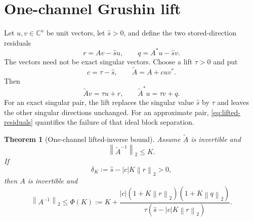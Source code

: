 \documentclass[11pt]{article}
\newtheorem{theorem}{Theorem}[section]
\theoremstyle{definition}
\theoremstyle{remark}
\newcommand{\C}{\mathbb C}
\newcommand{\norm}[1]{\left\lVert#1\right\rVert}
\newcommand{\Atilde}{\widetilde A}
\begin{document}
\section{One-channel Grushin lift}
\label{sec:grushin}

Let $u,v\in\C^n$ be unit vectors, let $\widehat s>0$, and define the two
stored-direction residuals
\begin{equation}
 r=Av-\widehat s u,
 \qquad
 q=A^*u-\widehat s v.
 \label{eq:singular-residuals}
\end{equation}
The vectors need not be exact singular vectors.  Choose a lift
$\tau>0$ and put
\begin{equation}
 c=\tau-\widehat s,
 \qquad
 \Atilde=A+cuv^*.
 \label{eq:lifted-operator}
\end{equation}
Then
\begin{equation}
 \Atilde v=\tau u+r,
 \qquad
 \Atilde^*u=\tau v+q.
 \label{eq:lifted-residuals}
\end{equation}
For an exact singular pair, the lift replaces the singular value
$\widehat s$ by $\tau$ and leaves the other singular directions unchanged.
For an approximate pair, \cref{eq:lifted-residuals} quantifies the failure of
that ideal block separation.

\begin{theorem}[One-channel lifted-inverse bound]
\label{thm:lifted-bound}
Assume $\Atilde$ is invertible and
\begin{equation}
 \norm{\Atilde^{-1}}_2\leq K.
 \label{eq:bulk-bound}
\end{equation}
If
\begin{equation}
 \delta_K:=\widehat s-|c|K\norm{r}_2>0,
 \label{eq:delta-k}
\end{equation}
then $A$ is invertible and
\begin{equation}
 \boxed{
 \norm{A^{-1}}_2
 \leq \Phi(K):=
 K+\frac{|c|(1+K\norm{r}_2)(1+K\norm{q}_2)}
 {\tau(\widehat s-|c|K\norm{r}_2)}.}
 \label{eq:phi-k}
\end{equation}
\end{theorem}
\end{document}

